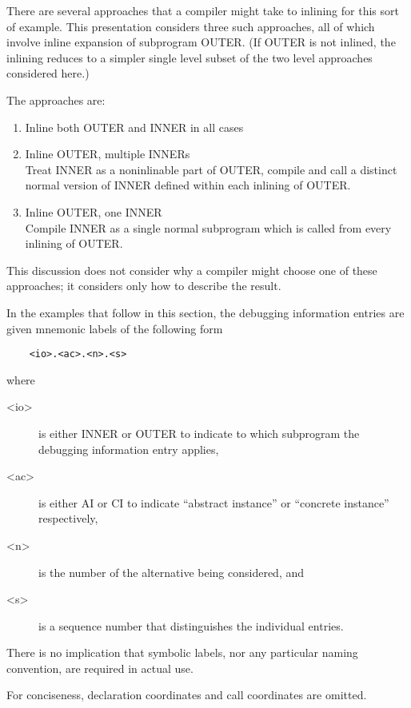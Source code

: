 There are several approaches that a compiler might take to
inlining for this sort of example. This presentation considers
three such approaches, all of which involve inline expansion
of subprogram OUTER. (If OUTER is not inlined, the inlining
reduces to a simpler single level subset of the two level
approaches considered here.)

The approaches are:
\begin{enumerate}[1. ]
\item  Inline both OUTER and INNER in all cases

\item Inline OUTER, multiple INNERs \\
Treat INNER as a non\dash inlinable part of OUTER, compile and
call a distinct normal version of INNER defined within each
inlining of OUTER.

\item Inline OUTER, one INNER \\
Compile INNER as a single normal subprogram which is called
from every inlining of OUTER.
\end{enumerate}

This discussion does not consider why a compiler might choose
one of these approaches; it considers only how to describe
the result.

In the examples that follow in this section, the debugging
information entries are given mnemonic labels of the following
form
\begin{verbatim}
    <io>.<ac>.<n>.<s>
\end{verbatim}
where
\begin{description}
\item[\textless io\textgreater]
is either INNER or OUTER to indicate to which
subprogram the debugging information entry applies, 
\item[\textless ac\textgreater]
is either AI or CI to indicate ``abstract instance'' or
``concrete instance'' respectively, 
\item[\textless n\textgreater]
is the number of the
alternative being considered, and 
\item[\textless s\textgreater]
is a sequence number that
distinguishes the individual entries. 
\end{description}
There is no implication
that symbolic labels, nor any particular naming convention,
are required in actual use.

For conciseness, declaration coordinates and call coordinates are omitted.

